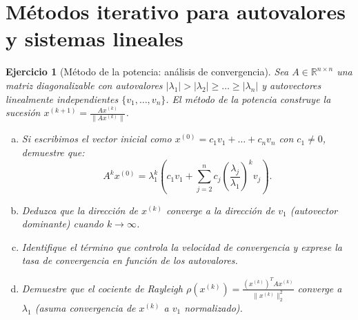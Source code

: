 \documentclass[12pt]{article}
\newtheorem{exercise}{Ejercicio}
\begin{document}

\section*{Métodos iterativo para autovalores y sistemas lineales}

\begin{exercise}[Método de la potencia: análisis de convergencia]
Sea $A \in \mathbb{R}^{n \times n}$ una matriz diagonalizable con autovalores $|\lambda_1| > |\lambda_2| \geq \dots \geq |\lambda_n|$ y autovectores linealmente independientes $\{v_1, \dots, v_n\}$.
El método de la potencia construye la sucesión $x^{(k+1)} = \frac{Ax^{(k)}}{\|Ax^{(k)}\|}$.
\begin{enumerate}[(a)]
\item Si escribimos el vector inicial como $x^{(0)} = c_1 v_1 + \dots + c_n v_n$ con $c_1 \neq 0$, demuestre que:
\[
A^k x^{(0)} = \lambda_1^k \left( c_1 v_1 + \sum_{j=2}^n c_j \left(\frac{\lambda_j}{\lambda_1}\right)^k v_j \right).
\]
\item Deduzca que la dirección de $x^{(k)}$ converge a la dirección de $v_1$ (autovector dominante) cuando $k \to \infty$.
\item Identifique el término que controla la velocidad de convergencia y exprese la tasa de convergencia en función de los autovalores.
\item Demuestre que el cociente de Rayleigh $\rho(x^{(k)}) = \frac{(x^{(k)})^T A x^{(k)}}{\|x^{(k)}\|_2^2}$ converge a $\lambda_1$ (asuma convergencia de $x^{(k)}$ a $v_1$ normalizado).
\end{enumerate}
\end{exercise}
\end{document}
